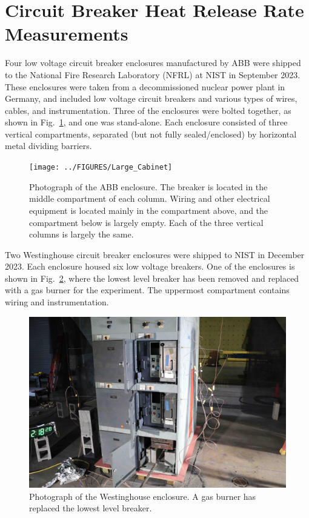 \documentclass[12pt]{article}
\begin{document}
\clearpage

\section{Circuit Breaker Heat Release Rate Measurements}
\label{Sec:Circuit Breakers}

Four low voltage circuit breaker enclosures manufactured by ABB were shipped to the National Fire Research Laboratory (NFRL) at NIST in September 2023. These enclosures were taken from a decommissioned nuclear power plant in Germany, and included low voltage circuit breakers and various types of wires, cables, and instrumentation. Three of the enclosures were bolted together, as shown in Fig.~\ref{fig:Cabinet_1}, and one was stand-alone. Each enclosure consisted of three vertical compartments, separated (but not fully sealed/enclosed) by horizontal metal dividing barriers.

\begin{figure}[ht]
\centering
\texttt{[image: ../FIGURES/Large\_Cabinet]}
\caption[Photograph of ABB enclosure] {Photograph of the ABB enclosure. The breaker is located in the middle compartment of each column. Wiring and other electrical equipment is located mainly in the compartment above, and the compartment below is largely empty. Each of the three vertical columns is largely the same.}
\label{fig:Cabinet_1}
\end{figure}

Two Westinghouse circuit breaker enclosures were shipped to NIST in December 2023. Each enclosure housed six low voltage breakers. One of the enclosures is shown in Fig.~\ref{fig:Cabinet_2}, where the lowest level breaker has been removed and replaced with a gas burner for the experiment. The uppermost compartment contains wiring and instrumentation.

\begin{figure}[ht]
\centering
\includegraphics[width=6.5in]{../FIGURES/Westinghouse}
\caption[Photograph of Westinghouse enclosure] {Photograph of the Westinghouse enclosure. A gas burner has replaced the lowest level breaker.}
\label{fig:Cabinet_2}
\end{figure}
\end{document}
